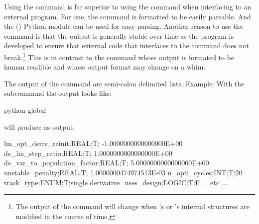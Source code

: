 Using the  command is far superior to using the  command when interfacing to an
external program. For one, the  command is formatted to be easily parsable. And the
 () Python module can be used for easy parsing. Another reason to use the
 command is that the output is generally stable over time as the \tao program is
developed to ensure that external code that interfaces to the  command does not
break.\footnote
  {
The output of the  command will change when \tao's or \bmad's internal structures are
modified in the course of time.
  }
This is in contrast to the  command whose output is formated to be human readible and whose
output format may change on a whim.

The output of the  command are semi-colon delimited lists. Example: With the subcommand
 the output looks like:
\begin{example}
  python global
\end{example}
will produce as output:
\begin{example}
  lm_opt_deriv_reinit;REAL;T; -1.0000000000000000E+00
  de_lm_step_ratio;REAL;T;  1.0000000000000000E+00
  de_var_to_population_factor;REAL;T;  5.0000000000000000E+00
  unstable_penalty;REAL;T;  1.0000000474974513E-03
  n_opti_cycles;INT;T;20
  track_type;ENUM;T;single
  derivative_uses_design;LOGIC;T;F
  ... etc ...
\end{example}

